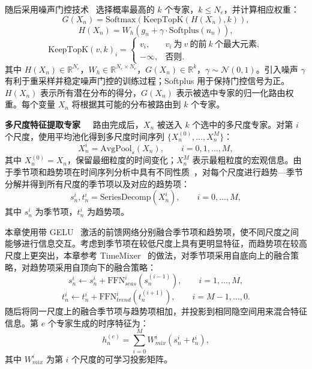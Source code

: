 随后采用噪声门控技术~\cite{moe} 选择概率最高的 $k$ 个专家，$k\leq N_e$，并计算相应权重：
\begin{equation}
{G}(X_n)=\mathrm{Softmax}\!\left(\mathrm{KeepTopK}\!\left({H}(X_n),k\right)\right),
\end{equation}
\begin{equation}
{H}(X_n)={W}_h\left({g}_n+\gamma\cdot\mathrm{Softplus}\!\left({n}_n\right)\right),
\end{equation}
\begin{equation}
\mathrm{KeepTopK}({v},k)_i=
\left\{
\begin{array}{ll}
v_i, & v_i \ \mbox{为}\ {v} \ \mbox{的前}\ k\ \mbox{个最大元素},\\
-\infty, & \mbox{否则}.
\end{array}
\right.
\end{equation}
其中 ${H}(X_n)\in\mathbb{R}^{N_e}$，${W}_h\in\mathbb{R}^{N_e\times N_e}$，${G}(X_n)\in\mathbb{R}^{k}$，$\gamma\sim\mathcal{N}(0,1)$。引入噪声 $\gamma$ 有利于重采样并稳定噪声门控的训练过程；Softplus 用于保持门控信号为正。${H}(X_n)$ 表示所有潜在分布的得分，${G}(X_n)$ 表示被选中专家的归一化路由权重。每个变量 $X_n$ 将根据其可能的分布被路由到 $k$ 个专家。

\noindent\textbf{多尺度特征提取专家\ \ } 路由完成后，$X_n$ 被送入 $k$ 个选中的多尺度专家。对第 $i$ 个尺度，使用平均池化得到多尺度时间序列 $\{X_n^{(0)},\ldots,X_n^{M}\}$：
\begin{equation}
X_n^{i}=\mathrm{AvgPool}_s\!\left(X_n\right),
\qquad i=0,1,\ldots,M,
\end{equation}
其中 $X_n^{(0)}=X_n$，保留最细粒度的时间变化；$X_n^{M}$ 表示最粗粒度的宏观信息。由于季节项和趋势项在时间序列分析中具有不同性质~\cite{autoformer,1990STL}，对每个尺度进行趋势—季节分解并得到所有尺度的季节项以及对应的趋势项：
\begin{equation}
{s}_n^{i},{t}_n^{i}=\mathrm{SeriesDecomp}\!\left(X_n^{i}\right),
\qquad i=0,\ldots,M,
\end{equation}
其中 ${s}_n^{i}$ 为季节项，${t}_n^{i}$ 为趋势项。

本章使用带 GELU~\cite{gelu} 激活的前馈网络分别融合季节项和趋势项，使不同尺度之间能够进行信息交互。考虑到季节项在较低尺度上具有更明显特征，而趋势项在较高尺度上更突出，本章参考 TimeMixer~\cite{timemixer} 的做法，对季节项采用自底向上的融合策略，对趋势项采用自顶向下的融合策略：
\begin{equation}
{s}_n^{i}\leftarrow {s}_n^{i}+\mathrm{FFN}_{{seas}}^{i}\!\left({s}_n^{(i-1)}\right),
\qquad i=1,\ldots,M,
\end{equation}
\begin{equation}
{t}_n^{i}\leftarrow {t}_n^{i}+\mathrm{FFN}_{{trend}}^{i}\!\left({t}_n^{(i+1)}\right),
\qquad i=M-1,\ldots,0.
\end{equation}
随后将同一尺度上的融合季节项与趋势项相加，并投影到相同隐空间用来混合特征信息。第 $e$ 个专家生成的时序特征为：
\begin{equation}
{h}_n^{(e)}=\sum_{i=0}^{M}{W}_{{mix}}^{i}\left({s}_n^{i}+{t}_n^{i}\right),
\end{equation}
其中 ${W}_{{mix}}^{i}$ 为第 $i$ 个尺度的可学习投影矩阵。

